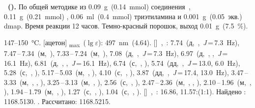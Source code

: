 \textbf{~().} 
По общей методике из \SI{0.09}{\gram}~(\SI{0.14}{\milli\mole}) соединения~, \SI{0.11}{\gram}~(\SI{0.21}{\milli\mole}) , \SI{0.06}{\milli\litre}~(\SI{0.4}{\milli\mole}) триэтиламина и \SI{0.001}{\gram}~(0.05~экв.) \ac{dmap}.
Время реакции 12 часов.
Темно-красный порошок, выход \SI{0.01}{\gram}~(\SI{7.5}{\percent}).
\begin{experimental}
     147--\SI{150}{\celsius}.
    [ацетон] \chemlambda\textsubscript{max}~($\lg \varepsilon$): \SI{497}{\nano\metre}~(4.64).
    []~\chemdelta,~\si{\ppm}: 7.74~(д,~,~\textit{J}\,=\,7.3~\si{\hertz}), 7.47\,--\,7.34~(м,~), 7.33\,--\,7.24~(м,~), 7.08~(д,~,~\textit{J}\,=\,7.3~\si{\hertz}), 6.97~(д,~, ,~\textit{J}\,=\,16.1~\si{\hertz}), 6.81~(д,~, ,~\textit{J}\,=\,16.1~\si{\hertz}), 6.74~(с,~, ), 5.74~(дд,~,~\textit{J}\,=\,13.0, 6.0~\si{\hertz}), 5.28~(с,~, ), 5.17\,--\,5.03~(м,~, ), 4.10~(с,~, ), 3.87~(дд,~,~\textit{J}\,=\,17.4, 13.0~\si{\hertz}), 3.47\,--\,3.33~(м,~, , ), 3.25\,--\,3.13~(м,~, ), 2.56~(с,~, ), 2.47\,--\,2.36~(м,~, , ), 2.10\,--\,1.96~(м,~, ), 1.94\,--\,1.79~(м,~, ), 1.27~(с,~, ), 1.04~(с,~, ).
    []~\chemdelta,~\si{\ppm}: 16.86, 11.57:(1:1).
     Найдено \ce{[M + H]+}: \num{1168.5130}. . Рассчитано: \ce{[M + H]} \num{1168.5215}.
\end{experimental}
